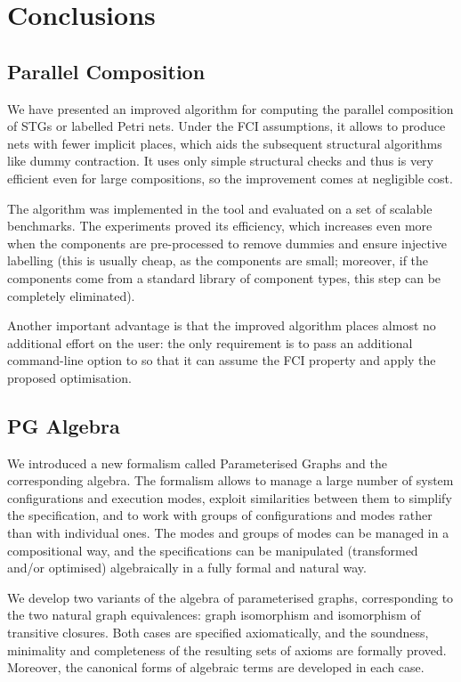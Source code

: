 \chapter{Conclusions\label{chap:Conclusion}}

\section{Parallel Composition}

We have presented an improved algorithm for computing the
parallel composition of STGs or labelled Petri nets. Under the
FCI assumptions, it allows to produce nets with fewer implicit
places, which aids the subsequent structural algorithms like
dummy contraction. It uses only simple structural checks and
thus is very efficient even for large compositions, so the
improvement comes at negligible cost.

The algorithm was implemented in the \pcomp tool and evaluated
on a set of scalable benchmarks. The experiments proved its
efficiency, which increases even more when the components are
pre-processed to remove dummies and ensure injective labelling
(this is usually cheap, as the components are small; moreover,
if the components come from a standard library of component
types, this step can be completely eliminated).

Another important advantage is that the improved algorithm
places almost no additional effort on the user: the only
requirement is to pass an additional command-line option to
\pcomp so that it can assume the FCI property and apply the
proposed optimisation.


\section{PG Algebra}

We introduced a new formalism called Parameterised Graphs and the
corresponding algebra. The formalism allows to manage a large number
of system configurations and execution modes, exploit similarities
between them to simplify the specification, and to work with groups
of configurations and modes rather than with individual ones. The
modes and groups of modes can be managed in a compositional way, and
the specifications can be manipulated (transformed and/or optimised)
algebraically in a fully formal and natural way.

We develop two variants of the algebra of parameterised graphs, corresponding
to the two natural graph equivalences: graph isomorphism and isomorphism
of transitive closures. Both cases are specified axiomatically, and
the soundness, minimality and completeness of the resulting sets of
axioms are formally proved. Moreover, the canonical forms of algebraic
terms are developed in each case.

